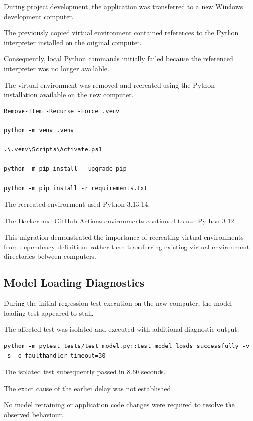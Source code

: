 \documentclass[11pt,a4paper]{article}
\begin{document}
During project development, the application was
transferred to a new Windows development computer.

The previously copied virtual environment contained
references to the Python interpreter installed on
the original computer.

Consequently, local Python commands initially failed
because the referenced interpreter was no longer
available.

The virtual environment was removed and recreated
using the Python installation available on the new
computer.

\begin{lstlisting}
Remove-Item -Recurse -Force .venv

python -m venv .venv

.\.venv\Scripts\Activate.ps1

python -m pip install --upgrade pip

python -m pip install -r requirements.txt
\end{lstlisting}

The recreated environment used Python 3.13.14.

The Docker and GitHub Actions environments continued
to use Python 3.12.

This migration demonstrated the importance of
recreating virtual environments from dependency
definitions rather than transferring existing
virtual environment directories between computers.

\subsection{Model Loading Diagnostics}

During the initial regression test execution on the
new computer, the model-loading test appeared to
stall.

The affected test was isolated and executed with
additional diagnostic output:

\begin{lstlisting}
python -m pytest tests/test_model.py::test_model_loads_successfully -v -s -o faulthandler_timeout=30
\end{lstlisting}

The isolated test subsequently passed in 8.60 seconds.

The exact cause of the earlier delay was not
established.

No model retraining or application code changes were
required to resolve the observed behaviour.
\end{document}
